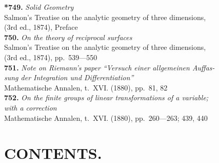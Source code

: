\documentclass[11pt,a4paper]{book}
\begin{document}
\textbf{*749.} \textit{Solid Geometry} \\
\hspace*{2em}Salmon's Treatise on the analytic geometry of three dimensions,\\
\hspace*{2em}(3rd ed., 1874), Preface\\[0.3em]
\textbf{750.} \textit{On the theory of reciprocal surfaces} \\
\hspace*{2em}Salmon's Treatise on the analytic geometry of three dimensions,\\
\hspace*{2em}(3rd ed., 1874), pp.~539---550\\[0.3em]
\textbf{751.} \textit{Note on Riemann's paper ``Versuch einer allgemeinen Auffas-}\\
\hspace*{2em}\textit{sung der Integration und Differentiation''} \\
\hspace*{2em}Mathematische Annalen, t.~XVI. (1880), pp.~81, 82\\[0.3em]
\textbf{752.} \textit{On the finite groups of linear transformations of a variable;}\\
\hspace*{2em}\textit{with a correction} \\
\hspace*{2em}Mathematische Annalen, t.~XVI. (1880), pp.~260---263; 439, 440

\cleardoublepage

\chapter*{CONTENTS.}
\end{document}
